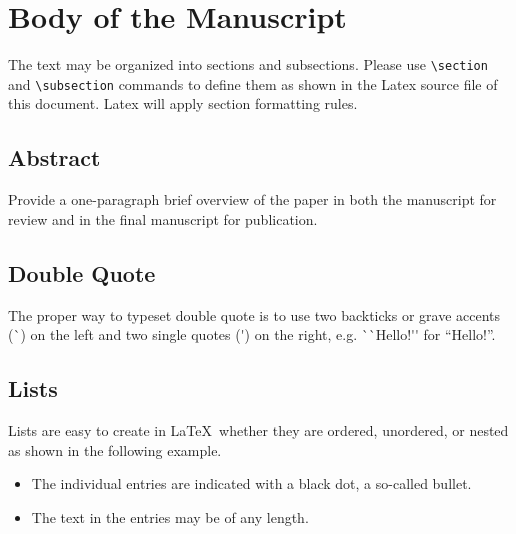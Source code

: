 \documentclass{article}
\begin{document}
\section{Body of the Manuscript}
The text may be organized into sections and subsections. Please use
\verb+\section+ and  \verb+\subsection+ commands to define them as shown in the
Latex source file of this document. Latex will apply section formatting rules.

\subsection{Abstract}
Provide a one-paragraph brief overview of the paper in both the manuscript for
review and in the final manuscript for publication.


\subsection{Double Quote}
The proper way to typeset double quote is to use two backticks or grave accents
(\`{}) on the left and two single quotes (\'{}) on the right, e.g.
\`{}\`{}Hello!\'{}\'{} for ``Hello!''.

\subsection{Lists}
Lists are easy to create in  \LaTeX\ whether they are ordered, unordered, or
nested as shown in the following example.

\begin{itemize}[noitemsep]
  \item The individual entries are indicated with a black dot, a so-called bullet.
  \item The text in the entries may be of any length.
\end{itemize}
\end{document}
